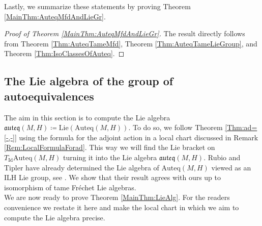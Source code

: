 \documentclass[12pt,a4paper]{article}
\theoremstyle{plain}
\theoremstyle{definition}
\newcommand{\Auteq}{\mathrm{Auteq}(M,H)}
\newcommand{\auteq}{\mathfrak{auteq}(M,H)}
\begin{document}
Lastly, we summarize these statements by proving Theorem \ref{MainThm:AuteqMfdAndLieGr}.

\begin{proof}[Proof of Theorem \ref{MainThm:AuteqMfdAndLieGr}]
    The result directly follows from Theorem \ref{Thm:AuteqTameMfd}, Theorem \ref{Thm:AuteqTameLieGroup}, and Theorem \ref{Thm:IsoClassesOfAuteq}.
\end{proof}









\subsection{The Lie algebra of the group of autoequivalences}

The aim in this section is to compute the Lie algebra $\auteq\coloneqq \mathrm{Lie}(\Auteq)$.
To do so, we follow Theorem \ref{Thm:ad=[-,-]} using the formula for the adjoint action in a local chart discussed in Remark \ref{Rem:LocalFormulaForad}.
This way we will find the Lie bracket on $T_{\mathrm{Id}}\Auteq$ turning it into the Lie algebra $\auteq$. Rubio and Tipler have already determined the Lie algebra of $\Auteq$ viewed as an ILH Lie group, see \cite{RubioTipler}. We show that their result agrees with ours up to isomorphism of tame Fréchet Lie algebras.\\

We are now ready to prove Theorem \ref{MainThm:LieAlg}. For the readers convenience we restate it here and make the local chart in which we aim to compute the Lie algebra precise.  
\end{document}
